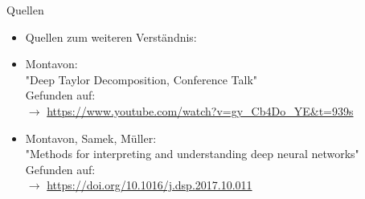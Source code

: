 \documentclass[t, compress]{beamer}
\begin{document}
\begin{frame}{Quellen}
\begin{itemize}
\item Quellen zum weiteren Verständnis:
\item Montavon: \\
"{}Deep Taylor Decomposition, Conference Talk"{}\\
Gefunden auf: \\
$\rightarrow$ \url{https://www.youtube.com/watch?v=gy_Cb4Do_YE&t=939s}
\label{itm:MontTalk}
\item Montavon, Samek, Müller:  \\
"{}Methods for interpreting and understanding deep neural networks"{}\\
Gefunden auf: \\
$\rightarrow$ \url{https://doi.org/10.1016/j.dsp.2017.10.011}
\label{itm:MethodsPaper}
\end{itemize}

\end{frame}


%
\end{document}
